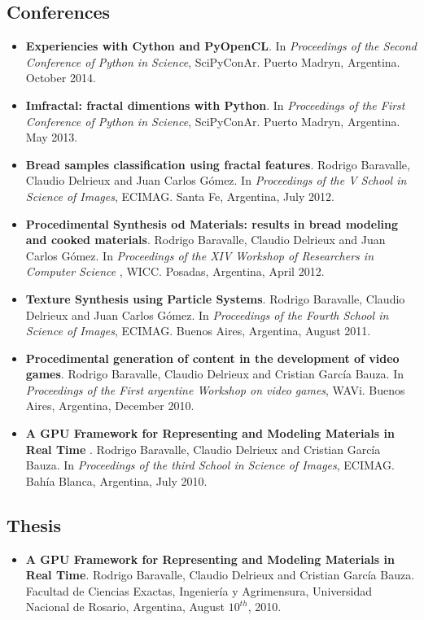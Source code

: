 \documentclass[a4paper,12pt]{article}
\begin{document}
\subsection*{\color{niceblue} Conferences}
\begin{itemize}
\item {\bf Experiencies with Cython and PyOpenCL}. In {\it Proceedings of the Second Conference of Python in Science}, SciPyConAr. Puerto Madryn, Argentina. October 2014.
\item {\bf Imfractal: fractal dimentions with Python}.  In {\it Proceedings of the First Conference of Python in Science}, SciPyConAr. Puerto Madryn, Argentina. May 2013.
\item {\bf Bread samples classification using fractal features}. Rodrigo Baravalle, Claudio Delrieux and Juan Carlos G\'omez. In {\it Proceedings of the V School in Science of Images}, ECIMAG. Santa Fe, Argentina, July 2012.
\item {\bf Procedimental Synthesis od Materials: results in bread modeling and cooked materials}. Rodrigo Baravalle, Claudio Delrieux and Juan Carlos G\'omez. In {\it Proceedings of the XIV Workshop of Researchers in Computer Science }, WICC. Posadas, Argentina, April 2012.
\item {\bf Texture Synthesis using Particle Systems}. Rodrigo Baravalle, Claudio Delrieux and Juan Carlos G\'omez. In {\it Proceedings of the Fourth School in Science of Images}, ECIMAG. Buenos Aires, Argentina, August 2011.
\item {\bf Procedimental generation of content in the development of video games}. Rodrigo Baravalle, Claudio Delrieux and Cristian Garc\'ia Bauza. In {\it Proceedings of the First argentine Workshop on video games}, WAVi. Buenos Aires, Argentina, December 2010.
\item {\bf A GPU Framework for Representing and Modeling Materials in Real Time }. Rodrigo Baravalle, Claudio Delrieux and Cristian Garc\'ia Bauza. In {\it Proceedings of the third School in Science of Images}, ECIMAG. Bahía Blanca, Argentina, July 2010.
\end{itemize}

\subsection*{\color{niceblue} Thesis}
\begin{itemize}
\item {\bf A GPU Framework for Representing and Modeling Materials in Real Time}. Rodrigo Baravalle, Claudio Delrieux and Cristian García Bauza. Facultad de Ciencias Exactas, Ingeniería y Agrimensura, Universidad Nacional de Rosario, Argentina, August $10^{th}$, 2010.
\end{itemize}
\end{document}
